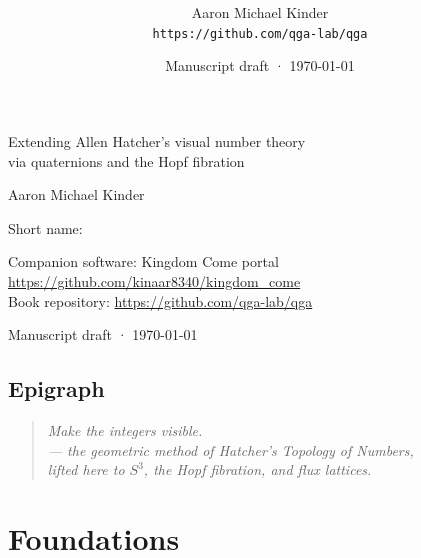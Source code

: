 \documentclass[11pt,oneside,openany]{book}
\title{%
  \textbf{\Huge\booktitle}\\[0.6em]
  \Large\booksubtitle
}
\author{Aaron Michael Kinder\\
  \texttt{https://github.com/qga-lab/qga}}
\date{Manuscript draft · \today}
\begin{document}
\frontmatter
{}

\begin{titlepage}
  \centering
  \vspace*{2.5cm}
  {\Huge\bfseries\booktitle\par}
  \vspace{1em}
  {\Large\booksubtitle\par}
  \vspace{0.8em}
  {\large Extending Allen Hatcher's visual number theory\\
   via quaternions and the Hopf fibration\par}
  \vspace{2.5cm}
  {\Large Aaron Michael Kinder\par}
  \vspace{0.5cm}
  {\large Short name: \bookshort\par}
  \vfill
  {\large Companion software: Kingdom Come portal\\
  \url{https://github.com/kinaar8340/kingdom_come}\\[0.4em]
  Book repository: \url{https://github.com/qga-lab/qga}\par}
  \vspace{1.5cm}
  {\large Manuscript draft · \today\par}
\end{titlepage}
\thispagestyle{empty}
\clearpage
\setcounter{page}{1}

\chapter*{Epigraph}
\begin{quote}
\itshape
Make the integers visible.\\
--- the geometric method of Hatcher's \emph{Topology of Numbers},\\
lifted here to \(S^3\), the Hopf fibration, and flux lattices.
\end{quote}

\tableofcontents




\mainmatter
\setcounter{chapter}{-1}

\part{Foundations}



\end{document}
